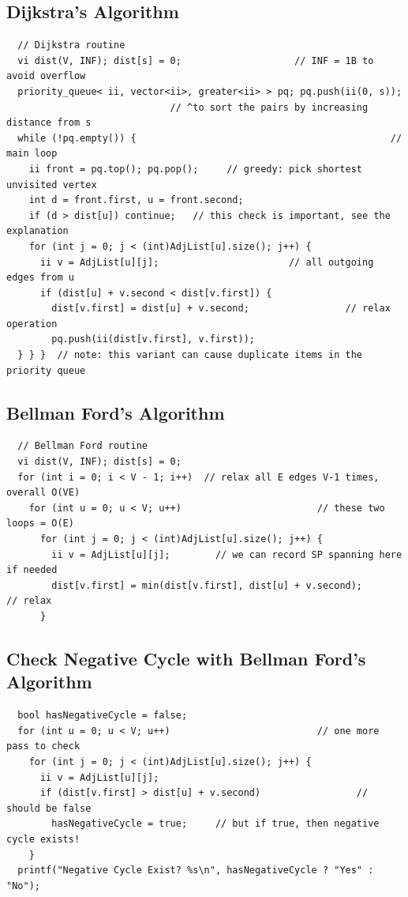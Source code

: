 \documentclass[10pt,landscape]{article}
\begin{document}
\begin{multicols}{2}
\subsection{Dijkstra's Algorithm}
\begin{lstlisting}
  // Dijkstra routine
  vi dist(V, INF); dist[s] = 0;                    // INF = 1B to avoid overflow
  priority_queue< ii, vector<ii>, greater<ii> > pq; pq.push(ii(0, s));
                             // ^to sort the pairs by increasing distance from s
  while (!pq.empty()) {                                             // main loop
    ii front = pq.top(); pq.pop();     // greedy: pick shortest unvisited vertex
    int d = front.first, u = front.second;
    if (d > dist[u]) continue;   // this check is important, see the explanation
    for (int j = 0; j < (int)AdjList[u].size(); j++) {
      ii v = AdjList[u][j];                       // all outgoing edges from u
      if (dist[u] + v.second < dist[v.first]) {
        dist[v.first] = dist[u] + v.second;                 // relax operation
        pq.push(ii(dist[v.first], v.first));
  } } }  // note: this variant can cause duplicate items in the priority queue
\end{lstlisting}

\subsection{Bellman Ford's Algorithm}
\begin{lstlisting}
  // Bellman Ford routine
  vi dist(V, INF); dist[s] = 0;
  for (int i = 0; i < V - 1; i++)  // relax all E edges V-1 times, overall O(VE)
    for (int u = 0; u < V; u++)                        // these two loops = O(E)
      for (int j = 0; j < (int)AdjList[u].size(); j++) {
        ii v = AdjList[u][j];        // we can record SP spanning here if needed
        dist[v.first] = min(dist[v.first], dist[u] + v.second);         // relax
      }
\end{lstlisting}

\subsection{Check Negative Cycle with Bellman Ford's Algorithm}
\begin{lstlisting}
  bool hasNegativeCycle = false;
  for (int u = 0; u < V; u++)                          // one more pass to check
    for (int j = 0; j < (int)AdjList[u].size(); j++) {
      ii v = AdjList[u][j];
      if (dist[v.first] > dist[u] + v.second)                 // should be false
        hasNegativeCycle = true;     // but if true, then negative cycle exists!
    }
  printf("Negative Cycle Exist? %s\n", hasNegativeCycle ? "Yes" : "No");
\end{lstlisting}


\end{multicols}
\end{document}
